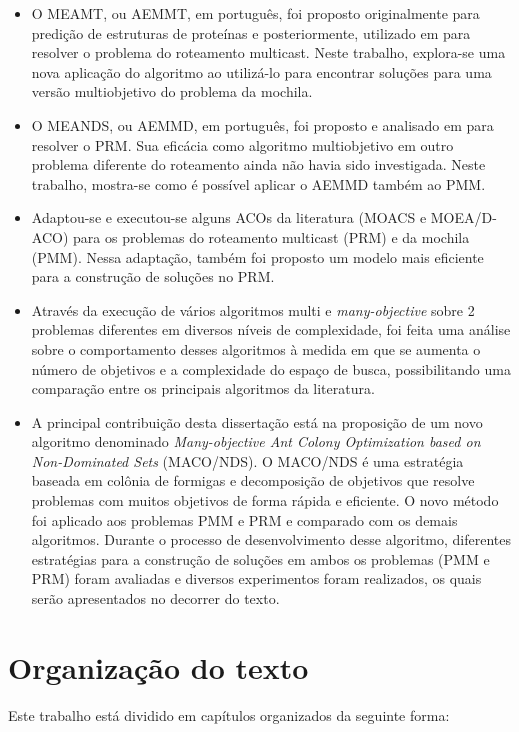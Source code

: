 \begin{itemize}  
	\item O \ac{MEAMT}, ou \ac{AEMMT}, em português, foi proposto originalmente para predição de estruturas de proteínas \cite{Brasil2013} e posteriormente, utilizado em  \cite{Lafeta2016} para resolver o problema do roteamento multicast. Neste trabalho, explora-se uma nova aplicação do algoritmo ao utilizá-lo para encontrar soluções para uma versão multiobjetivo do problema da mochila.
	\item O \ac{MEANDS}, ou \ac{AEMMD}, em português, foi proposto e analisado em \cite{Lafeta2016} para resolver o \ac{PRM}. Sua eficácia como algoritmo multiobjetivo em outro problema diferente do roteamento ainda não havia sido investigada. Neste trabalho, mostra-se como é possível aplicar o \ac{AEMMD} também ao \ac{PMM}.
	\item Adaptou-se e executou-se alguns ACOs da literatura (\ac{MOACS} e \ac{MOEA/D-ACO}) para os problemas do roteamento multicast (PRM) e da mochila (PMM). Nessa adaptação, também foi proposto um modelo mais eficiente para a construção de soluções no PRM.
	\item Através da execução de vários algoritmos multi e \textit{many-objective} sobre 2 problemas diferentes em diversos níveis de complexidade, foi feita uma análise sobre o comportamento desses algoritmos à medida em que se aumenta o número de objetivos e a complexidade do espaço de busca, possibilitando uma comparação entre os principais algoritmos da literatura.
	\item A principal contribuição desta dissertação está na proposição de um novo algoritmo denominado \textit{Many-objective Ant Colony Optimization based on Non-Dominated Sets} (MACO/NDS). O MACO/NDS é uma estratégia baseada em colônia de formigas e decomposição de objetivos que resolve problemas com muitos objetivos de forma rápida e eficiente. O novo método foi aplicado aos problemas \ac{PMM} e \ac{PRM} e comparado com os demais algoritmos. Durante o processo de desenvolvimento desse algoritmo, diferentes estratégias para a construção de soluções em ambos os problemas (PMM e PRM) foram avaliadas e diversos experimentos foram realizados, os quais serão apresentados no decorrer do texto.
\end{itemize}

\section{Organização do texto}
Este trabalho está dividido em capítulos organizados da seguinte forma:

